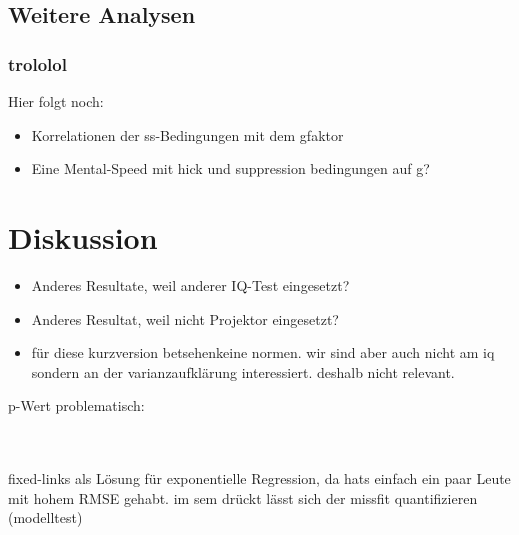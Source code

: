 \documentclass[11pt, twoside, a4paper]{book}		%
\begin{document}
\section{Weitere Analysen}


\subsection{trololol}

Hier folgt noch:
\begin{itemize}
	\item Korrelationen der \gls{ss}-Bedingungen mit dem \gls{gfaktor}
	\item Eine Mental-Speed mit hick und suppression bedingungen auf g?
\end{itemize}



\chapter{Diskussion \label{cha:Diskussion}}
\begin{itemize}
	\item Anderes Resultate, weil anderer IQ-Test eingesetzt?
	\item Anderes Resultat, weil nicht Projektor eingesetzt?
	\item für diese kurzversion betsehenkeine normen. wir sind aber auch nicht am iq sondern an der varianzaufklärung interessiert. deshalb nicht relevant.
\end{itemize}

p-Wert problematisch:\\
\citet{Gelman2006}\\
\citet{Wasserstein2016}\\
\citet{Nuzzo2014}


fixed-links als Lösung für exponentielle Regression, da hats einfach ein paar Leute mit hohem RMSE gehabt. im sem drückt lässt sich der missfit quantifizieren (modelltest)




\printglossaries	%
\end{document}
